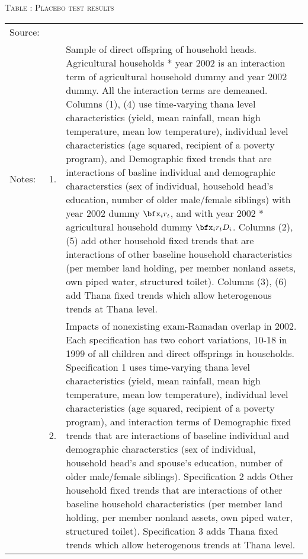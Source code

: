 \begin{table}
\hfil\textsc{\footnotesize Table \thetable: Placebo test results\label{PlaceboResults10Table}}\\
\setlength{\tabcolsep}{1pt}
\renewcommand{\arraystretch}{.55}
\hfil

\renewcommand{\arraystretch}{1}
\hfil\begin{tabular}{>{\hfill\scriptsize}p{1cm}<{}>{\hfill\scriptsize}p{.5cm}<{}>{\scriptsize}p{12cm}<{\hfill}}
Source:& \multicolumn{2}{l}{\scriptsize Compiled from IFPRI data. }\\[-1ex]
Notes:& 1. & Sample of direct offspring of household heads. \textsf{Agricultural households * year 2002} is an interaction term of agricultural household dummy and year 2002 dummy. All the interaction terms are demeaned. Columns \textsf{(1), (4)} use time-varying thana level characteristics (yield, mean rainfall, mean high temperature, mean low temperature), individual level characteristics (age squared, recipient of a poverty program), and \textsf{Demographic fixed trends} that are interactions of basline individual and demographic characterstics (sex of individual, household head's education, number of older male/female siblings) with year 2002 dummy $\bfx_{i}r_{t}$, and with year 2002 * agricultural household dummy $\bfx_{i}r_{t}D_{i}$. Columns \textsf{(2), (5)} add \textsf{other household fixed trends} that are interactions of other baseline household characteristics (per member land holding, per member nonland assets, own piped water, structured toilet). Columns \textsf{(3), (6)} add \textsf{Thana fixed trends} which allow heterogenous trends at Thana level. \\[-1ex]
& 2. & Impacts of nonexisting exam-Ramadan overlap in 2002. Each specification has two cohort variations, \textsf{10-18 in 1999} of all children and direct offsprings in households. \textsf{Specification 1} uses time-varying thana level characteristics (yield, mean rainfall, mean high temperature, mean low temperature), individual level characteristics (age squared, recipient of a poverty program), and interaction terms of \textsf{Demographic fixed trends} that are interactions of baseline individual and demographic characterstics (sex of individual, household head's and spouse's education, number of older male/female siblings). \textsf{Specification 2} adds \textsf{Other household fixed trends} that are interactions of other baseline household characteristics (per member land holding, per member nonland assets, own piped water, structured toilet). \textsf{Specification 3} adds \textsf{Thana fixed trends} which allow heterogenous trends at Thana level. \\[-1ex]

\end{tabular}
\end{table}
